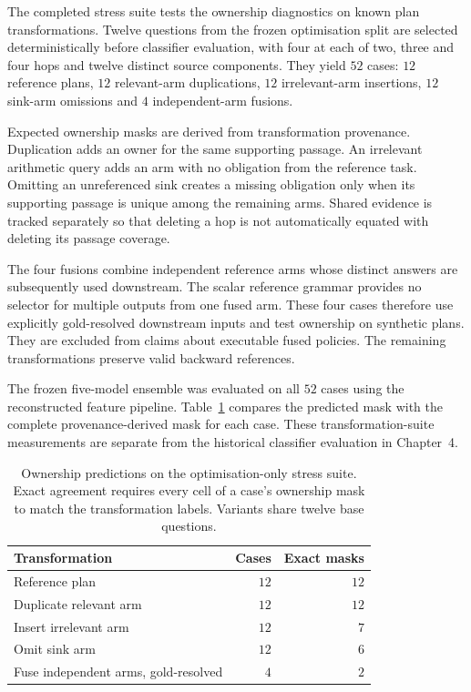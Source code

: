 The completed stress suite tests the ownership diagnostics on known plan
transformations. Twelve questions from the frozen optimisation split are selected
deterministically before classifier evaluation, with four at each of two,
three and four hops and twelve distinct source components. They yield
$52$ cases: $12$ reference plans, $12$ relevant-arm duplications, $12$
irrelevant-arm insertions, $12$ sink-arm omissions and $4$ independent-arm
fusions.

Expected ownership masks are derived from transformation provenance.
Duplication adds an owner for the same supporting passage. An irrelevant
arithmetic query adds an arm with no obligation from the reference task.
Omitting an unreferenced sink creates a missing obligation only when its
supporting passage is unique among the remaining arms. Shared evidence is
tracked separately so that deleting a hop is not automatically equated with
deleting its passage coverage.

The four fusions combine independent reference arms whose distinct answers
are subsequently used downstream. The scalar reference grammar provides
no selector for multiple outputs from one fused arm. These four cases
therefore use explicitly gold-resolved downstream inputs and test ownership
on synthetic plans. They are excluded from claims about executable fused
policies. The remaining transformations preserve valid backward references.

The frozen five-model ensemble was evaluated on all $52$ cases using the
reconstructed feature pipeline. Table~\ref{tab:ch5-ownership-stress}
compares the predicted mask with the complete provenance-derived mask for
each case. These transformation-suite measurements are separate from the
historical classifier evaluation in Chapter~4.

\begin{table}[H]
\centering
\small
\caption{Ownership predictions on the optimisation-only stress suite.
Exact agreement requires every cell of a case's ownership mask to match
the transformation labels. Variants share twelve base questions.}
\label{tab:ch5-ownership-stress}
\begin{tabular}{lrr}
\hline
Transformation & Cases & Exact masks \\
\hline
Reference plan & $12$ & $12$ \\
Duplicate relevant arm & $12$ & $12$ \\
Insert irrelevant arm & $12$ & $7$ \\
Omit sink arm & $12$ & $6$ \\
Fuse independent arms, gold-resolved & $4$ & $2$ \\
\hline
\end{tabular}
\end{table}

